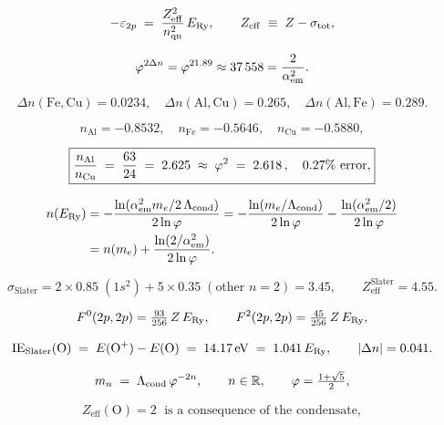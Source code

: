 \begin{equation}
  -\varepsilon_{2p}
  \;=\; \frac{Z_\mathrm{eff}^2}{n_\mathrm{qn}^2}\,E_{\mathrm{Ry}},
  \qquad
  Z_\mathrm{eff} \;\equiv\; Z - \sigma_\mathrm{tot},
  \label{P11:eq:eps_Zeff}
\end{equation}

\begin{equation}
  \varphi^{2\Delta n}
  = \varphi^{21.89}
  \approx 37\,558
  = \frac{2}{\alpha_{\mathrm{em}}^2}.
  \label{P11:eq:gap}
\end{equation}

\begin{equation}
  \Delta n(\mathrm{Fe,Cu}) = 0.0234, \quad
  \Delta n(\mathrm{Al,Cu}) = 0.265, \quad
  \Delta n(\mathrm{Al,Fe}) = 0.289.
\end{equation}

\begin{equation}
  n_{\mathrm{Al}} = -0.8532, \quad
  n_{\mathrm{Fe}} = -0.5646, \quad
  n_{\mathrm{Cu}} = -0.5880,
\end{equation}

\begin{equation}
  \boxed{\frac{n_{\mathrm{Al}}}{n_{\mathrm{Cu}}} \;=\; \frac{63}{24}
  \;=\; 2.625 \;\approx\; \varphi^2 \;=\; 2.618\,,\quad
  0.27\%\ \text{error},}
\end{equation}

\begin{align}
  n\!\left(E_{\mathrm{Ry}}\right)
  &= -\frac{\ln(\alpha_{\mathrm{em}}^2 m_e / 2\,\Lambda_{\mathrm{cond}})}{2\ln\varphi}
   = -\frac{\ln(m_e/\Lambda_{\mathrm{cond}})}{2\ln\varphi}
     -\frac{\ln(\alpha_{\mathrm{em}}^2/2)}{2\ln\varphi} \notag\\
  &= n(m_e) + \frac{\ln(2/\alpha_{\mathrm{em}}^2)}{2\ln\varphi}.
  \label{P11:eq:nRy_proof}
\end{align}

\begin{equation}
  \sigma_\mathrm{Slater}
  = 2\times0.85\;(1s^2) + 5\times0.35\;(\text{other } n{=}2)
  = 3.45,
  \qquad
  Z_\mathrm{eff}^\mathrm{Slater} = 4.55 .
  \label{P11:eq:sigma_slater}
\end{equation}

\begin{equation}
  F^0(2p,2p) = \tfrac{93}{256}\,Z\,E_{\mathrm{Ry}},
  \qquad
  F^2(2p,2p) = \tfrac{45}{256}\,Z\,E_{\mathrm{Ry}},
  \label{P11:eq:slater_condon}
\end{equation}

\begin{equation}
  \mathrm{IE}_\mathrm{Slater}(\mathrm{O})
  \;=\; E(\mathrm{O}^+) - E(\mathrm{O})
  \;=\; 14.17\,\mathrm{eV}
  \;=\; 1.041\,E_{\mathrm{Ry}},
  \qquad
  |\Delta n| = 0.041 .
  \label{P11:eq:IE_slater_total}
\end{equation}

\begin{equation}
  m_n \;=\; \Lambda_{\mathrm{cond}}\,\varphi^{-2n}, \qquad n \in \mathbb{R}, \qquad
  \varphi = \tfrac{1+\sqrt{5}}{2},
  \label{P11:eq:tower}
\end{equation}

\begin{equation}
  \boxed{
    Z_\mathrm{eff}(\mathrm{O}) = 2
    \;\text{ is a consequence of the condensate}
  },
  \label{P11:eq:Zeff_condensate_origin}
\end{equation}

